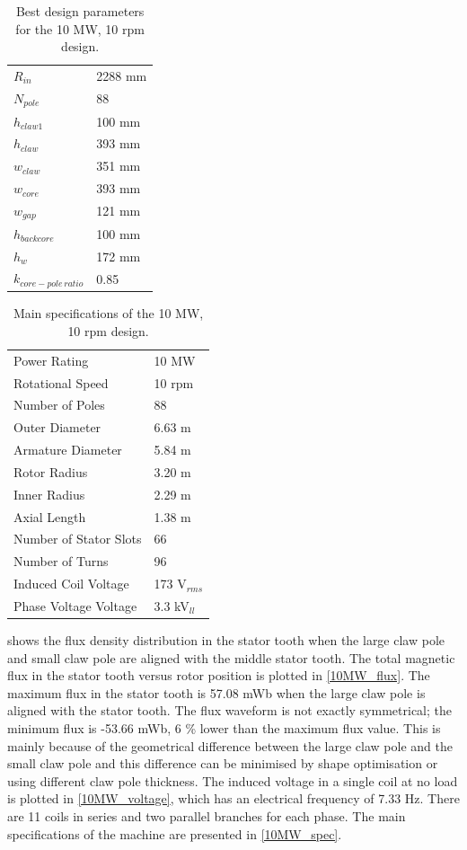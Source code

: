 \documentclass[final,peerreview,onecolumn]{IEEEtran}
\begin{document}
\begin{table}
  \centering
  \begin{tabular}{ll}
\hline
$R_{in}$ & 2288 mm \\
$N_{pole}$ & 88 \\
$h_{claw1}$ & 100 mm\\
$h_{claw}$ & 393 mm\\
$w_{claw}$ & 351 mm\\
$w_{core}$ & 393 mm\\
$w_{gap}$ & 121 mm\\
$h_{backcore}$ & 100 mm\\
$h_{w}$ & 172 mm\\
$k_{core-pole \, ratio}$ & 0.85 \\
\hline
 \end{tabular}
  \caption{Best design parameters for the 10 MW, 10 rpm design.}
  \label{10MW_design_parameters}
\end{table}

\begin{table}[t]
  \centering
  \begin{tabular}{ll}
\hline
Power Rating & 10 MW \\
Rotational Speed & 10 rpm \\
Number of Poles & 88 \\
\hline
Outer Diameter & 6.63 m \\
Armature Diameter & 5.84 m \\
Rotor Radius & 3.20 m \\
Inner Radius & 2.29 m \\
Axial Length & 1.38 m \\
\hline
Number of Stator Slots & 66 \\
Number of Turns & 96 \\
Induced Coil Voltage & 173 V$_{rms}$\\
Phase Voltage Voltage & 3.3 kV$_{ll}$ \\
\hline
 \end{tabular}
  \caption{Main specifications of the 10 MW, 10 rpm design.}
  \label{10MW_spec}
\end{table}


 shows the flux density distribution in the stator tooth when the large claw pole and small claw pole are aligned with the middle stator tooth.
The total magnetic flux in the stator tooth versus rotor position is plotted in \autoref{10MW_flux}.
The maximum flux in the stator tooth is 57.08 mWb when the large claw pole is aligned with the stator tooth. The flux waveform is not exactly symmetrical; the minimum flux is -53.66 mWb, 6 \% lower than the maximum flux value. This is mainly because of the geometrical difference between the large claw pole and the small claw pole and this difference can be minimised by shape optimisation or using different claw pole thickness. The induced voltage in a single coil at no load is plotted in \autoref{10MW_voltage}, which has an electrical frequency of 7.33 Hz. There are 11 coils in series and two parallel branches for each phase. The main specifications of the machine are presented in \autoref{10MW_spec}.
\end{document}
